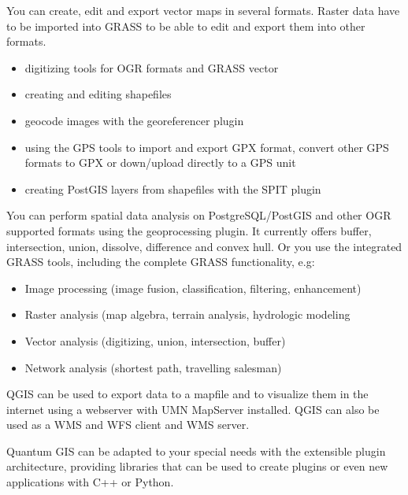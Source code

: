 
You can create, edit and export vector maps in several formats. Raster data
have to be imported into GRASS to be able to edit and export them into other
formats.  

\begin{itemize}
\item digitizing tools for OGR formats and GRASS vector
\item creating and editing shapefiles
\item geocode images with the georeferencer plugin
\item using the GPS tools to import and export GPX format, convert other GPS
formats to GPX or down/upload directly to a GPS unit
\item creating PostGIS layers from shapefiles with the SPIT plugin 
\end{itemize}


You can perform spatial data analysis on PostgreSQL/PostGIS and other OGR
supported formats using the geoprocessing plugin. It currently offers buffer,
intersection, union, dissolve, difference and convex hull. Or you use the 
integrated GRASS tools, including the complete GRASS functionality, e.g:

\begin{itemize}
\item Image processing (image fusion, classification, filtering, enhancement)
\item Raster analysis (map algebra, terrain analysis, hydrologic modeling
\item Vector analysis (digitizing, union, intersection, buffer)
\item Network analysis (shortest path, travelling salesman)
\end{itemize}


QGIS can be used to export data to a mapfile and to visualize them in the
internet using a webserver with UMN MapServer installed. QGIS can also
be used as a WMS and WFS client and WMS server. 


Quantum GIS can be adapted to your special needs with the extensible
plugin architecture, providing libraries that can be used to create plugins
or even new applications with C++ or Python.     

